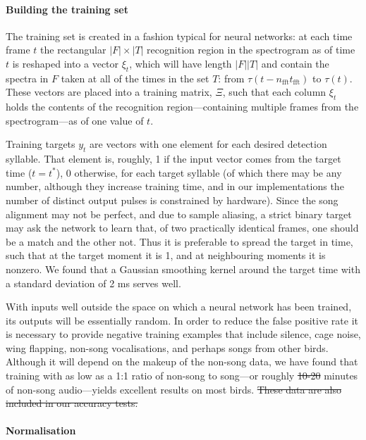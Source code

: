 \documentclass[10pt,letterpaper]{article}
\renewcommand{\subsubsection}[1]{\paragraph{#1}}
\providecommand{\DIFaddtex}[1]{{\protect\color{blue}\uwave{#1}}} %
\providecommand{\DIFdeltex}[1]{{\protect\color{red}\sout{#1}}}                      %
\providecommand{\DIFaddbegin}{} %
\providecommand{\DIFaddend}{} %
\providecommand{\DIFdelbegin}{} %
\providecommand{\DIFdelend}{} %
\providecommand{\DIFadd}[1]{\texorpdfstring{\DIFaddtex{#1}}{#1}} %
\providecommand{\DIFdel}[1]{\texorpdfstring{\DIFdeltex{#1}}{}} %
\newcommand{\DIFscaledelfig}{0.5}
\newlength{\DIFdelgraphicswidth} %
\newlength{\DIFdelgraphicsheight} %
\newcommand{\DIFaddincludegraphics}[2][]{{\color{blue}\fbox{\DIFOincludegraphics[#1]{#2}}}} %
\newcommand{\DIFdelincludegraphics}[2][]{%
\sbox{\DIFdelgraphicsbox}{\DIFOincludegraphics[#1]{#2}}%
\settoboxwidth{\DIFdelgraphicswidth}{\DIFdelgraphicsbox} %
\settoboxtotalheight{\DIFdelgraphicsheight}{\DIFdelgraphicsbox} %
\scalebox{\DIFscaledelfig}{%
\parbox[b]{\DIFdelgraphicswidth}{\usebox{\DIFdelgraphicsbox}\\[-\baselineskip] \rule{\DIFdelgraphicswidth}{0em}}\llap{\resizebox{\DIFdelgraphicswidth}{\DIFdelgraphicsheight}{%
\setlength{\unitlength}{\DIFdelgraphicswidth}%
\begin{picture}(1,1)%
\thicklines\linethickness{2pt} %
{\color[rgb]{1,0,0}\put(0,0){\framebox(1,1){}}}%
{\color[rgb]{1,0,0}\put(0,0){\line( 1,1){1}}}%
{\color[rgb]{1,0,0}\put(0,1){\line(1,-1){1}}}%
\end{picture}%
}\hspace*{3pt}}} %
} %
\DeclareRobustCommand{\DIFaddbegin}{\DIFOaddbegin \let\includegraphics\DIFaddincludegraphics} %
\DeclareRobustCommand{\DIFaddend}{\DIFOaddend \let\includegraphics\DIFOincludegraphics} %
\DeclareRobustCommand{\DIFdelbegin}{\DIFOdelbegin \let\includegraphics\DIFdelincludegraphics} %
\DeclareRobustCommand{\DIFdelend}{\DIFOaddend \let\includegraphics\DIFOincludegraphics} %
\begin{document}
\subsubsection{Building the training set}

The training set is created in a fashion typical for neural networks:
at each time frame $t$ the rectangular $|F|\times |T|$ recognition
region in the spectrogram as of time $t$ is reshaped into a vector
$\xi_t$, which will have length $|F||T|$ and contain the spectra in
$F$ taken at all of the times in the set $T$: from
$\tau(t-n_\textrm{fft}t_\textrm{fft})$ to $\tau(t)$.  These vectors
are placed into a training matrix, $\Xi$, such that each column
$\xi_t$ holds the contents of the recognition region---containing
multiple frames from the spectrogram---as of one value of $t$.

Training targets $y_t$ are vectors with one element for each desired
detection syllable.  That element is, roughly, 1 if the input vector
comes from the target time ($t=t^*$), 0 otherwise, for each target
syllable (of which there may be any number, although they increase
training time, and in our implementations the number of distinct
output pulses is constrained by hardware).  Since the song alignment
may not be perfect, and due to sample aliasing, a
strict binary target may ask the network to learn that, of two
practically identical frames, one should be a match and the other
not. Thus it is preferable to spread the target in time, such that at
the target moment it is 1, and at neighbouring moments it is
nonzero. We found that a Gaussian smoothing kernel around the target
time with a standard deviation of 2 ms serves well.

With inputs well outside the space on which a neural network has been
trained, its outputs will be essentially random. In order to reduce
the false positive rate it is necessary to provide negative training
examples that include silence, cage noise, wing flapping, non-song
vocalisations, and perhaps songs from other birds.  Although it will
depend on the makeup of the non-song data, we have found that training
with as low as a 1:1 ratio of non-song to song---or roughly \DIFdelbegin \DIFdel{10-20
}\DIFdelend \DIFaddbegin \DIFadd{10
}\DIFaddend minutes of non-song audio---yields excellent results on most birds.
\DIFdelbegin \DIFdel{These data are also included in our accuracy tests.
}\DIFdelend 


\subsubsection{Normalisation}
\end{document}
